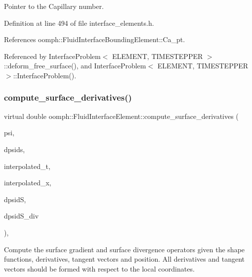 Pointer to the Capillary number. 



Definition at line 494 of file interface\+\_\+elements.\+h.



References oomph\+::\+Fluid\+Interface\+Bounding\+Element\+::\+Ca\+\_\+pt.



Referenced by Interface\+Problem$<$ E\+L\+E\+M\+E\+N\+T, T\+I\+M\+E\+S\+T\+E\+P\+P\+E\+R $>$\+::deform\+\_\+free\+\_\+surface(), and Interface\+Problem$<$ E\+L\+E\+M\+E\+N\+T, T\+I\+M\+E\+S\+T\+E\+P\+P\+E\+R $>$\+::\+Interface\+Problem().

\mbox{\label{classoomph_1_1FluidInterfaceElement_a0180a8e36fadbbe6984f9b3c5edffc81}} 
\subsubsection{\texorpdfstring{compute\+\_\+surface\+\_\+derivatives()}{compute\_surface\_derivatives()}}
{\footnotesize\ttfamily virtual double oomph\+::\+Fluid\+Interface\+Element\+::compute\+\_\+surface\+\_\+derivatives (\begin{DoxyParamCaption}\item[{const Shape \&}]{psi,  }\item[{const D\+Shape \&}]{dpsids,  }\item[{const Dense\+Matrix$<$ double $>$ \&}]{interpolated\+\_\+t,  }\item[{const Vector$<$ double $>$ \&}]{interpolated\+\_\+x,  }\item[{D\+Shape \&}]{dpsidS,  }\item[{D\+Shape \&}]{dpsid\+S\+\_\+div }\end{DoxyParamCaption})\hspace{0.3cm}{\ttfamily [protected]}, {}}



Compute the surface gradient and surface divergence operators given the shape functions, derivatives, tangent vectors and position. All derivatives and tangent vectors should be formed with respect to the local coordinates. 

